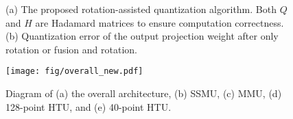 \begin{figure}[!tb]
  \centering 
  \caption{
(a) The proposed rotation-assisted quantization algorithm.
Both $Q$ and $H$ are Hadamard matrices to ensure computation correctness.
(b) Quantization error of the output projection weight after only rotation or fusion and rotation.
}
  \label{fig:fusion_cause_error}
\end{figure}

\begin{figure*}[!tb]
    \centering
    \texttt{[image: fig/overall\_new.pdf]}
    \vspace{-10pt}
    \caption{Diagram of (a) the overall architecture, (b) SSMU, (c) MMU, (d) 128-point HTU, and (e) 40-point HTU.}
    \vspace{-10pt}
    \label{fig: Hardware Design}
\end{figure*}

